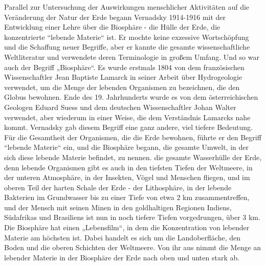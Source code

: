 \documentclass[11pt,a4paper]{article}
\begin{document}
Parallel zur Untersuchung der Auswirkungen menschlicher Aktivitäten auf die
Veränderung der Natur der Erde begann Vernadsky 1914-1916 mit der Entwicklung
einer Lehre über die Biosphäre - die Hülle der Erde, die konzentrierte
“lebende Materie“ ist. Er mochte keine exzessive Wortschöpfung und die
Schaffung neuer Begriffe, aber er kannte die gesamte wissenschaftliche
Weltliteratur und verwendete deren Terminologie in großem Umfang. Und so war
auch der Begriff „Biosphäre“. Es wurde erstmals 1804 von dem französischen
Wissenschaftler Jean Baptiste Lamarck in seiner Arbeit über Hydrogeologie
verwendet, um die Menge der lebenden Organismen zu bezeichnen, die den Globus
bewohnen. Ende des 19. Jahrhunderts wurde es von dem österreichischen Geologen
Eduard Suess und dem deutschen Wissenschaftler Johan Walter verwendet, aber
wiederum in einer Weise, die dem Verständnis Lamarcks nahe kommt. Vernadsky
gab diesem Begriff eine ganz andere, viel tiefere Bedeutung. Für die
Gesamtheit der Organismen, die die Erde bewohnen, führte er den Begriff
“lebende Materie“ ein, und die Biosphäre begann, die gesamte Umwelt, in der
sich diese lebende Materie befindet, zu nennen. die gesamte Wasserhülle der
Erde, denn lebende Organismen gibt es auch in den tiefsten Tiefen der
Weltmeere, in der unteren Atmosphäre, in der Insekten, Vögel und Menschen
fliegen, und im oberen Teil der harten Schale der Erde - der Lithosphäre, in
der lebende Bakterien im Grundwasser bis zu einer Tiefe von etwa 2 km
zusammentreffen, und der Mensch mit seinen Minen in den goldhaltigen Regionen
Indiens, Südafrikas und Brasiliens ist nun in noch tiefere Tiefen
vorgedrungen, über 3 km. Die Biosphäre hat einen „Lebensfilm“, in dem die
Konzentration von lebender Materie am höchsten ist. Dabei handelt es sich um
die Landoberfläche, den Boden und die oberen Schichten der Weltmeere. Von ihr
aus nimmt die Menge an lebender Materie in der Biosphäre der Erde nach oben
und unten stark ab.
\end{document}

